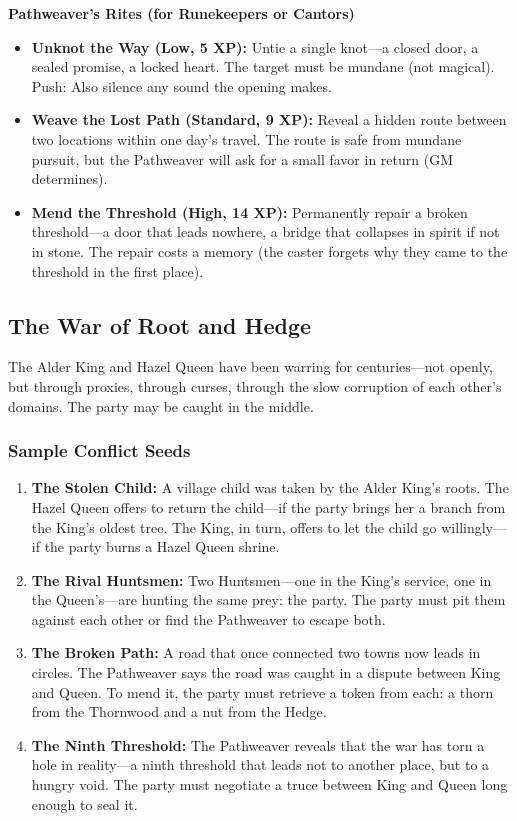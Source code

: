 \documentclass[11pt]{article}
\begin{document}
\textbf{Pathweaver's Rites (for Runekeepers or Cantors)}
\begin{itemize}
\item \textbf{Unknot the Way (Low, 5 XP):} Untie a single knot---a closed door, a sealed promise, a locked heart. The target must be mundane (not magical). Push: Also silence any sound the opening makes.
\item \textbf{Weave the Lost Path (Standard, 9 XP):} Reveal a hidden route between two locations within one day's travel. The route is safe from mundane pursuit, but the Pathweaver will ask for a small favor in return (GM determines).
\item \textbf{Mend the Threshold (High, 14 XP):} Permanently repair a broken threshold---a door that leads nowhere, a bridge that collapses in spirit if not in stone. The repair costs a memory (the caster forgets why they came to the threshold in the first place).
\end{itemize}

\subsection{The War of Root and Hedge}

The Alder King and Hazel Queen have been warring for centuries---not openly, but through proxies, through curses, through the slow corruption of each other's domains. The party may be caught in the middle.

\subsubsection{Sample Conflict Seeds}

\begin{enumerate}
\item \textbf{The Stolen Child:} A village child was taken by the Alder King's roots. The Hazel Queen offers to return the child---if the party brings her a branch from the King's oldest tree. The King, in turn, offers to let the child go willingly---if the party burns a Hazel Queen shrine.
\item \textbf{The Rival Huntsmen:} Two Huntsmen---one in the King's service, one in the Queen's---are hunting the same prey: the party. The party must pit them against each other or find the Pathweaver to escape both.
\item \textbf{The Broken Path:} A road that once connected two towns now leads in circles. The Pathweaver says the road was caught in a dispute between King and Queen. To mend it, the party must retrieve a token from each: a thorn from the Thornwood and a nut from the Hedge.
\item \textbf{The Ninth Threshold:} The Pathweaver reveals that the war has torn a hole in reality---a ninth threshold that leads not to another place, but to a hungry void. The party must negotiate a truce between King and Queen long enough to seal it.
\end{enumerate}
\end{document}

